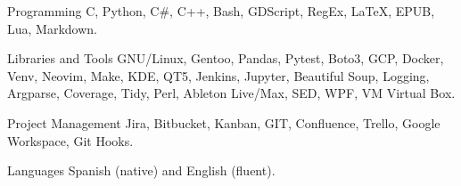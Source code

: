 

\begin{cvskills}

  \cvskill
    {Programming} %
    {C, Python, C\#, C++, Bash, GDScript, RegEx, LaTeX, EPUB, Lua, Markdown.} %

  \cvskill
    {Libraries and Tools}
    {GNU/Linux, Gentoo, Pandas, Pytest, Boto3, GCP, Docker, Venv, Neovim, Make, KDE, QT5, Jenkins, Jupyter,}
  \cvskill
    {}
    {Beautiful Soup, Logging, Argparse, Coverage, Tidy, Perl, Ableton Live/Max, SED, WPF, VM Virtual Box.}

  \cvskill
    {Project Management}
    {Jira, Bitbucket, Kanban, GIT, Confluence, Trello, Google Workspace, Git Hooks.}

  \cvskill
    {Languages}
    {Spanish (native) and English (fluent).}


\end{cvskills}
